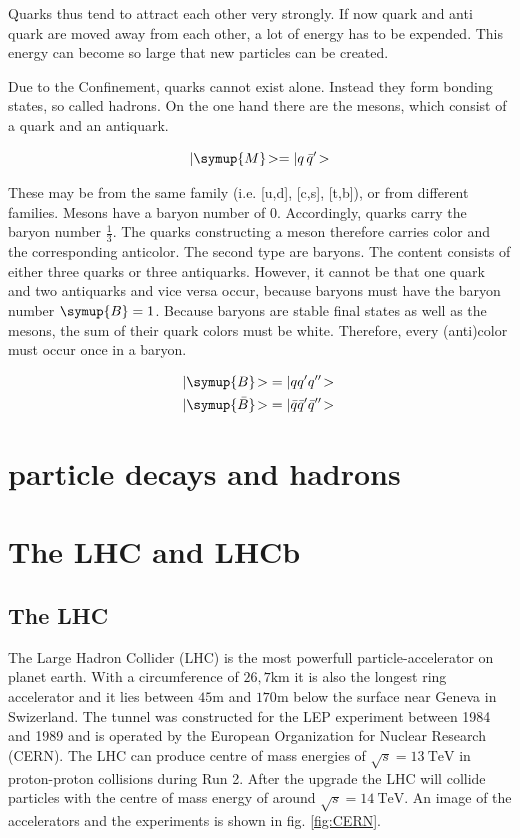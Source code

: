 Quarks thus tend to attract each other very strongly. If now
quark and anti quark are moved away from each other, a lot of energy has to be expended. This energy can become so large that new particles can be created.

Due to the Confinement, quarks cannot exist alone. Instead they form bonding states, so called hadrons. On the one hand there are the mesons, which consist of a quark
and an antiquark.

\begin{equation}
	|\symup{M}\!> = | q\, \bar{q}'\!>
\end{equation}

These may be from the same family (i.e. [u,d], [c,s], [t,b]), or from
different families. Mesons have a baryon number of 0. Accordingly, quarks carry the baryon number $\frac{1}{3}$. The quarks constructing a meson therefore carries color and the corresponding anticolor.
The second type are baryons. The content consists of either three quarks or
three antiquarks. However, it cannot be that one quark and two antiquarks
and vice versa occur, because baryons must have the baryon number $\symup{B} = 1$. Because baryons are stable final states as well as the mesons, the sum of their quark colors must be white. Therefore, every (anti)color must occur once in a baryon.

\begin{align}
	|\symup{B}\!> &= |q q' q''\!> \\
	|\symup{\bar{B}}\!> &= |\bar{q} \bar{q}' \bar{q}''\!> \,
\end{align}

\section{particle decays and hadrons}
\label{sec:decays}

\section{The LHC and LHCb}
\label{sec:lhcandB}

\subsection{The LHC}
The Large Hadron Collider (LHC)\cite{lhcInfo} is the most powerfull particle-accelerator on planet earth. With a circumference of $26,7\si{\kilo\metre}$ it is also the longest ring accelerator and it lies between $45\si{\metre}$ and $170\si{\metre}$ below the surface near Geneva in Swizerland. The tunnel was constructed for the LEP experiment between 1984 and 1989 and is operated by the European Organization for Nuclear Research (CERN). The LHC can produce centre of mass energies of $\sqrt{s} = \SI{13}{\tera\electronvolt}$ in proton-proton collisions during Run 2. After the upgrade the LHC will collide particles with the centre of mass energy of around $\sqrt{s} = \SI{14}{\tera\electronvolt}$.
An image of the accelerators and the experiments is shown in fig. \ref{fig:CERN}.

